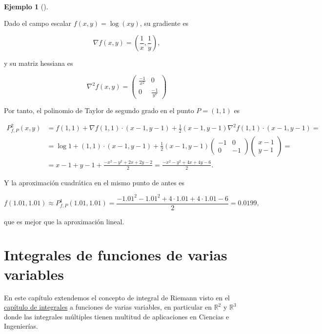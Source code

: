 \documentclass[
  a4paper,
]{scrreport}
\theoremstyle{definition}
\theoremstyle{definition}
\newtheorem{example}{Ejemplo}[chapter]
\theoremstyle{definition}
\theoremstyle{plain}
\theoremstyle{plain}
\theoremstyle{plain}
\theoremstyle{remark}
\begin{document}
\begin{example}[]\protect\hypertarget{exm-polinomio-taylor-funcion-varias-variables}{}\label{exm-polinomio-taylor-funcion-varias-variables}

Dado el campo escalar \(f(x,y)=\log(xy)\), su gradiente es

\[
\nabla f(x,y) = \left(\frac{1}{x},\frac{1}{y}\right),
\]

y su matriz hessiana es

\[
\nabla ^2 f(x,y) 
= \left(
\begin{array}{cc}
\frac{-1}{x^2} & 0\\
0 & \frac{-1}{y^2}
\end{array}
\right)
\]

Por tanto, el polinomio de Taylor de segundo grado en el punto
\(P=(1,1)\) es

\begin{align*}
P^2_{f,P}(x,y) &= f(1,1) +\nabla f(1,1)\cdot (x-1,y-1) + \frac{1}{2}(x-1,y-1)\nabla^2f(1,1)\cdot(x-1,y-1)=\\
&= \log 1+(1,1)\cdot(x-1,y-1) + \frac{1}{2}(x-1,y-1)
\left(
\begin{array}{cc}
-1 & 0\\
0 & -1
\end{array}
\right)
\left(
\begin{array}{c}
x-1\\
y-1
\end{array}
\right)
= \\
&= x-1+y-1+\frac{-x^2-y^2+2x+2y-2}{2} = \frac{-x^2-y^2+4x+4y-6}{2}.
\end{align*}

Y la aproximación cuadrática en el mismo punto de antes es

\[
f(1.01,1.01) \approx P^1_{f,P}(1.01,1.01) = \frac{-1.01^2-1.01^2+4\cdot 1.01+4\cdot 1.01-6}{2} = 0.0199,
\]

que es mejor que la aproximación lineal.

\end{example}


\chapter{Integrales de funciones de varias
variables}\label{integrales-de-funciones-de-varias-variables}

En este capítulo extendemos el concepto de integral de Riemann visto en
el \href{08-integrales.qmd}{capítulo de integrales} a funciones de
varias variables, en particular en \(\mathbb{R}^2\) y \(\mathbb{R}^3\)
donde las integrales múltiples tienen multitud de aplicaciones en
Ciencias e Ingenierías.
\end{document}
